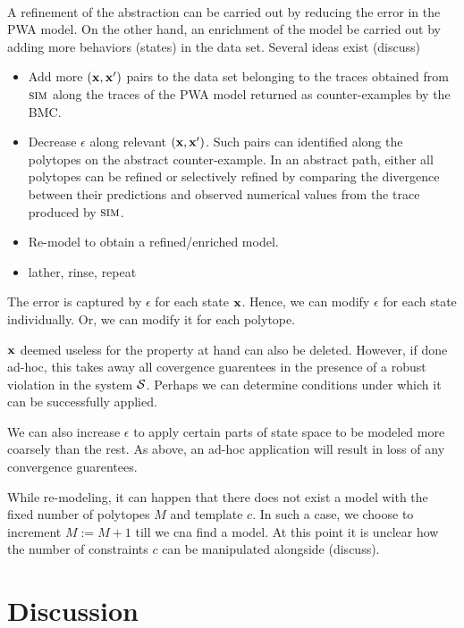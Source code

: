 \\
A refinement of the abstraction can be carried
out by reducing the error in the PWA model. On the other hand, an
enrichment of the model be carried out by adding more behaviors
(states) in the data set.
Several ideas exist (discuss)
\begin{itemize}
    \item Add more $(\mathbf{x}, \mathbf{x}')$ pairs to the data set belonging to
        the traces obtained from $\mbox{\sc sim}$ along the traces of
        the PWA model returned as counter-examples by the BMC.
    \item Decrease $\epsilon$ along relevant $(\mathbf{x},\mathbf{x}')$. Such pairs
        can identified along the polytopes on the abstract
        counter-example. In an abstract path, either all polytopes can
        be refined or selectively refined by comparing the divergence
        between their predictions and observed numerical values from
        the trace produced by $\mbox{\sc sim}$.
    \item Re-model to obtain a refined/enriched model.
    \item lather, rinse, repeat
\end{itemize}

The error is captured by $\epsilon$ for each state $\mathbf{x}$.
Hence, we can modify $\epsilon$ for each state individually. Or, we
can modify it for each polytope.

 $\mathbf{x}$ deemed useless for the property at
hand can also be deleted. However, if done ad-hoc, this takes away all
covergence guarentees in the presence of a robust violation in the
system $\mathcal{S}$. Perhaps we can determine conditions under which it
can be successfully applied.

 We can also increase
$\epsilon$ to apply certain parts of state space to be modeled more
coarsely than the rest. As above, an ad-hoc application will result in
loss of any convergence guarentees.

While re-modeling, it can happen that there does not exist a model
with the fixed number of polytopes $M$ and template $c$. In such a
case, we choose to increment $M := M + 1$ till we cna find a model. At
this point it is unclear how the number of constraints $c$ can be
manipulated alongside (discuss).

\section{Discussion}

